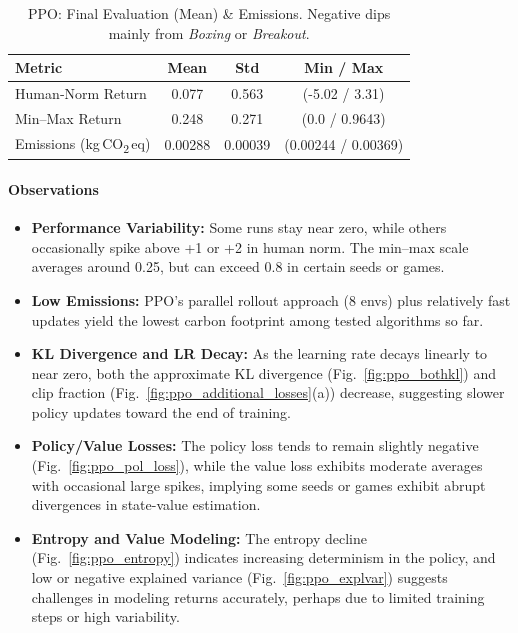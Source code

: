 \begin{table} 
	\caption{PPO: Final Evaluation (Mean) \& Emissions. Negative dips mainly from \emph{Boxing} or \emph{Breakout}.}
	\label{tab:ppo_eval}
	\centering
	\begin{tabular}{lccc}
		\toprule
		\textbf{Metric} & \textbf{Mean} & \textbf{Std} & \textbf{Min / Max}\\
		\midrule
		Human‐Norm Return & 0.077 & 0.563 & (-5.02 / 3.31)\\
		Min--Max Return   & 0.248 & 0.271 & (0.0 / 0.9643)\\
		Emissions (kg\,CO\textsubscript{2}\,eq) & 0.00288 & 0.00039 & (0.00244 / 0.00369)\\
		\bottomrule
	\end{tabular}
\end{table}
\medskip
\paragraph{Observations}
\begin{itemize}
	\item \textbf{Performance Variability:} 
	Some runs stay near zero, while others occasionally spike above +1 or +2 in human norm. 
	The min--max scale averages around 0.25, but can exceed 0.8 in certain seeds or games.
	\item \textbf{Low Emissions:} 
	PPO's parallel rollout approach (8 envs) plus relatively fast updates 
	yield the lowest carbon footprint among tested algorithms so far.
	\item \textbf{KL Divergence and LR Decay:} As the learning rate decays linearly to near zero, both the approximate KL divergence (Fig.~\ref{fig:ppo_bothkl}) and clip fraction (Fig.~\ref{fig:ppo_additional_losses}(a)) decrease, suggesting slower policy updates toward the end of training.
	\item \textbf{Policy/Value Losses:} The policy loss tends to remain slightly negative (Fig.~\ref{fig:ppo_pol_loss}), while the value loss exhibits moderate averages with occasional large spikes, implying some seeds or games exhibit abrupt divergences in state-value estimation.
	\item \textbf{Entropy and Value Modeling:} The entropy decline (Fig.~\ref{fig:ppo_entropy}) indicates increasing determinism in the policy, and low or negative explained variance (Fig.~\ref{fig:ppo_explvar}) suggests challenges in modeling returns accurately, perhaps due to limited training steps or high variability.
\end{itemize}

